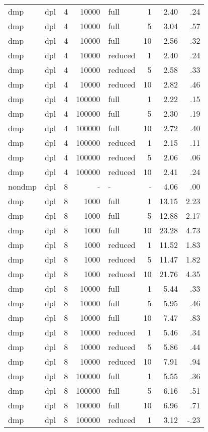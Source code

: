 \begin{center}
\begin{small}
\begin{longtable}{llrrlrrr}
dmp & dpl & 4 & 10000 & full & 1 & 2.40 & .24\\
dmp & dpl & 4 & 10000 & full & 5 & 3.04 & .57\\
dmp & dpl & 4 & 10000 & full & 10 & 2.56 & .32\\
dmp & dpl & 4 & 10000 & reduced & 1 & 2.40 & .24\\
dmp & dpl & 4 & 10000 & reduced & 5 & 2.58 & .33\\
dmp & dpl & 4 & 10000 & reduced & 10 & 2.82 & .46\\
dmp & dpl & 4 & 100000 & full & 1 & 2.22 & .15\\
dmp & dpl & 4 & 100000 & full & 5 & 2.30 & .19\\
dmp & dpl & 4 & 100000 & full & 10 & 2.72 & .40\\
dmp & dpl & 4 & 100000 & reduced & 1 & 2.15 & .11\\
dmp & dpl & 4 & 100000 & reduced & 5 & 2.06 & .06\\
dmp & dpl & 4 & 100000 & reduced & 10 & 2.41 & .24\\
nondmp & dpl & 8 & - & - & - & 4.06 & .00\\
dmp & dpl & 8 & 1000 & full & 1 & 13.15 & 2.23\\
dmp & dpl & 8 & 1000 & full & 5 & 12.88 & 2.17\\
dmp & dpl & 8 & 1000 & full & 10 & 23.28 & 4.73\\
dmp & dpl & 8 & 1000 & reduced & 1 & 11.52 & 1.83\\
dmp & dpl & 8 & 1000 & reduced & 5 & 11.47 & 1.82\\
dmp & dpl & 8 & 1000 & reduced & 10 & 21.76 & 4.35\\
dmp & dpl & 8 & 10000 & full & 1 & 5.44 & .33\\
dmp & dpl & 8 & 10000 & full & 5 & 5.95 & .46\\
dmp & dpl & 8 & 10000 & full & 10 & 7.47 & .83\\
dmp & dpl & 8 & 10000 & reduced & 1 & 5.46 & .34\\
dmp & dpl & 8 & 10000 & reduced & 5 & 5.86 & .44\\
dmp & dpl & 8 & 10000 & reduced & 10 & 7.91 & .94\\
dmp & dpl & 8 & 100000 & full & 1 & 5.55 & .36\\
dmp & dpl & 8 & 100000 & full & 5 & 6.16 & .51\\
dmp & dpl & 8 & 100000 & full & 10 & 6.96 & .71\\
dmp & dpl & 8 & 100000 & reduced & 1 & 3.12 & -.23\\

\end{longtable}
\end{small}
\end{center}
